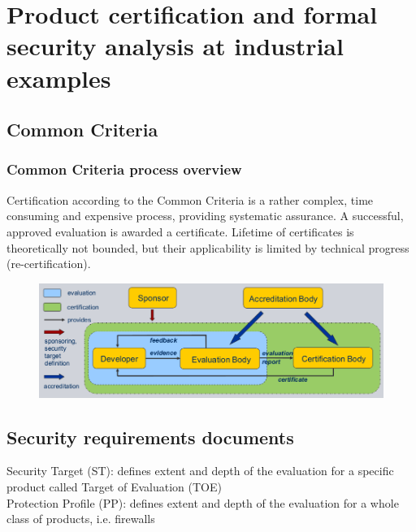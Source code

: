 \documentclass[a4paper, 12pt]{article}
\begin{document}
\section{Product certification and
formal security analysis
at industrial examples}
\subsection{Common Criteria}
	\subsubsection{Common Criteria process overview}
	Certification according to the Common Criteria is a rather complex, time
	consuming and expensive process, providing systematic assurance.
	A successful, approved evaluation is awarded a certificate.
	Lifetime of certificates is theoretically not bounded, but their
	applicability is limited by technical progress (re-certification).
		\begin{figure}[H]
		\centering
		\includegraphics[width=1\linewidth]{./img/cc_01}
		\label{fig:cc_01}
		\end{figure}
	\subsection{Security requirements documents}
		Security Target (ST):
		defines extent and depth of the evaluation
		for a specific product called Target of Evaluation (TOE) \\
		Protection Profile (PP):
		defines extent and depth of the evaluation
		for a whole class of products, i.e. firewalls
\end{document}
